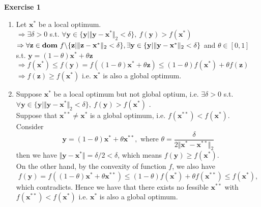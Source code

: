 \documentclass[11pt,letter,notitlepage]{article}
\DeclareMathOperator*{\dom}{\bf dom\,}
\begin{document}
\begin{solution}
	\textbf{Exercise 1}
	\begin{enumerate}
		\item
		Let $\mathbf{x}^*$ be a local optimum.\\
		$\Rightarrow\exists \delta>0$ s.t. $\forall \mathbf{y}\in \{\mathbf{y}|\Vert\mathbf{y-x^*}\Vert_2<\delta\},~f(\mathbf{y})>f(\mathbf{x}^*)$ \\
		$\Rightarrow\forall \mathbf{z} \in \dom f\backslash \{\mathbf{z}|\Vert\mathbf{z-x^*}\Vert_2<\delta\}, \exists \mathbf{y}\in \{\mathbf{y}|\Vert\mathbf{y-x^*}\Vert_2<\delta\}$ and $\theta\in[0,1]$\\ s.t. $\mathbf{y}=(1-\theta)\mathbf{x}^*+\theta\mathbf{z}$ \\
		$\Rightarrow f(\mathbf{x}^*)\leqslant f(\mathbf{y})=f((1-\theta)\mathbf{x}^*+\theta\mathbf{z})\leqslant (1-\theta)f(\mathbf{x}^*)+\theta f(\mathbf{z})$\\
		$\Rightarrow f(\mathbf{z})\geqslant f(\mathbf{x}^*)$ i.e. $\mathbf{x}^*$ is also a global optimum.
		\item
		Suppose $ \mathbf{x}^* $ be a local optimum but not global optium, i.e. $\exists \delta>0$ s.t. \\$\forall \mathbf{y}\in \{\mathbf{y}|\Vert\mathbf{y-x^*}\Vert_2<\delta\},~f(\mathbf{y})>f(\mathbf{x}^*)$ .\\
		Suppose that $\mathbf{x}^{**}\neq\mathbf{x}^{*}$ is a global optimum, i.e. $f(\mathbf{x}^{**})<f(\mathbf{x}^*)$.\\
		Consider $$\mathbf{y}=(1-\theta)\mathbf{x}^*+\theta\mathbf{x}^{**}, \text{ where }\theta = \frac{\delta}{2\Vert\mathbf{x^*-x^{**}}\Vert_2}$$
		then we have $\Vert\mathbf{y-x^*}\Vert=\delta/2<\delta$, which means $f(\mathbf{y})\geqslant f(\mathbf{x}^*)$.\\
		On the other hand, by the convexity of function $f$, we also have $$ f(\mathbf{y})=f((1-\theta)\mathbf{x}^*+\theta\mathbf{x}^{**})\leqslant(1-\theta)f(\mathbf{x}^*)+\theta f(\mathbf{x}^{**})\leq f(\mathbf{x}^*), $$
		which contradicts. Hence we have that there exists no fessible $\mathbf{x}^{**}$ with $f(\mathbf{x}^{**})<f(\mathbf{x}^*)$ i.e. $\mathbf{x}^*$ is also a global optimum.
		
	\end{enumerate}
\end{solution}


\newpage
\end{document}
